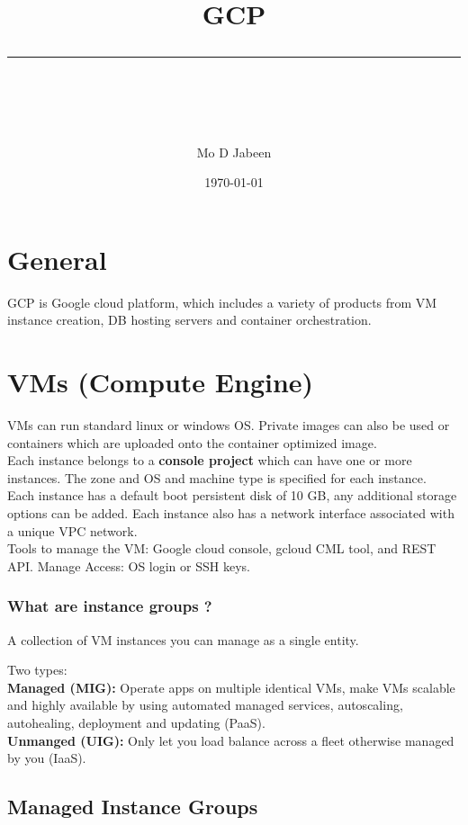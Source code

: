 \documentclass[11pt]{scrartcl} %
\title{	
	\normalfont\normalsize
	\vspace{20pt} %
	{\huge GCP}\\ %
	\vspace{12pt} %
	\rule{\linewidth}{2pt}\\ %
}
\author{\small Mo D Jabeen} %
\date{\normalsize\today} %
\begin{document}
\maketitle %

\section{General}

GCP is Google cloud platform, which includes a variety of products from VM instance creation, DB hosting
servers and container orchestration.

\section{VMs (Compute Engine)}

VMs can run standard linux or windows OS. Private images can also be used or containers which are uploaded
onto the container optimized image.\\

Each instance belongs to a \textbf{console project} which can have one or more instances. The zone and
OS and machine type is specified for each instance.\\

Each instance has a default boot persistent disk of 10 GB, any additional storage options can be added.
Each instance also has a network interface associated with a unique VPC network. \\

Tools to manage the VM: Google cloud console, gcloud CML tool, and REST API. Manage Access: OS login or
SSH keys.

\subsubsection{What are instance groups ?}

A collection of VM instances you can manage as a single entity. 

Two types:\\
\textbf{Managed (MIG):} Operate apps on multiple identical VMs, make VMs scalable and highly available
by using automated managed services, autoscaling, autohealing, deployment and updating (PaaS).\\
\textbf{Unmanged (UIG):} Only let you load balance across a fleet otherwise managed by you (IaaS).

\subsection{Managed Instance Groups}
\end{document}
